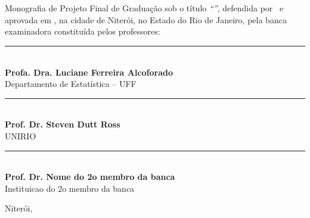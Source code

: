 \documentclass[12pt,a4paper,header]{abnt}
\begin{document}
\begin{folhadeaprovacao}

\thispagestyle{logouff}

\hspace{.2\textwidth} %
\begin{minipage}{.7\textwidth}

\begin{flushright}

{\large \bf \ABNTautordata}\\[1cm]

{\large \bf \ABNTtitulodata}\\[1cm]

\end{flushright}

Monografia de Projeto Final de Graduação sob o título \textit{``\ABNTtitulodata''},
defendida por \ABNTautordata~e aprovada em \ABNTdatadata, na cidade de Niterói,
no Estado do Rio de Janeiro, pela banca examinadora constituída pelos
professores:

\begin{flushright}

\begin{espacosimples}






\vspace{2cm}
\noindent\rule{8cm}{0.4pt}\\
{\bf Profa. Dra. Luciane Ferreira Alcoforado}\\
Departamento de Estatística -- UFF\\


\vspace{2cm}
\noindent\rule{8cm}{0.4pt}\\
{\bf Prof. Dr. Steven Dutt Ross}\\
UNIRIO\\


\vspace{2cm}
\noindent\rule{8cm}{0.4pt}\\
{\bf Prof. Dr. Nome do 2o membro da banca}\\
Instituicao do 2o membro da banca\\

\end{espacosimples}

\end{flushright}

\vspace{2cm}
\hfill Niterói, \ABNTdatadata

\end{minipage}




\end{folhadeaprovacao}
\end{document}
